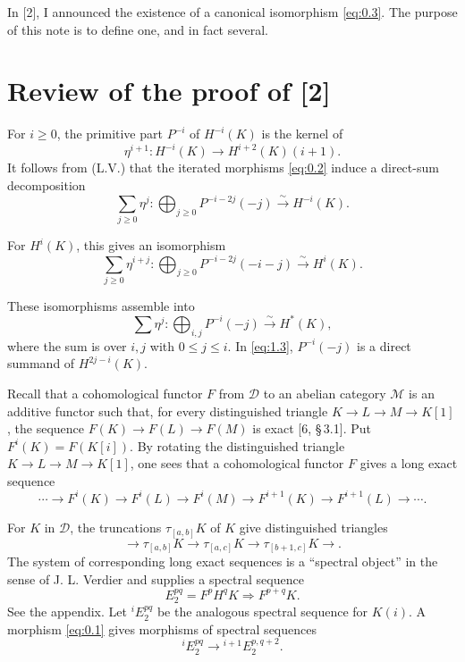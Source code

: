 \documentclass[11pt,a4paper]{article}
\theoremstyle{plain}
\theoremstyle{definition}
\theoremstyle{remark}
\newcommand{\cD}{\mathscr{D}}
\newcommand{\cM}{\mathscr{M}}
\begin{document}
In [2], I announced the existence of a canonical isomorphism \eqref{eq:0.3}. The purpose of this note is to define one, and in fact several.

\section{Review of the proof of [2]}

For $i\geqslant0$, the primitive part $P^{-i}$ of $H^{-i}(K)$ is the kernel of
\[
\eta^{i+1}\colon H^{-i}(K)\to H^{i+2}(K)(i+1).
\]
It follows from (L.V.) that the iterated morphisms \eqref{eq:0.2} induce a direct-sum decomposition
\begin{equation}\label{eq:1.1}
\sum_{j\geqslant0}\eta^j\colon \bigoplus_{j\geqslant0}P^{-i-2j}(-j)\xrightarrow{\sim}H^{-i}(K).
\end{equation}

For $H^i(K)$, this gives an isomorphism
\begin{equation}\label{eq:1.2}
\sum_{j\geqslant0}\eta^{i+j}\colon \bigoplus_{j\geqslant0}P^{-i-2j}(-i-j)\xrightarrow{\sim}H^i(K).
\end{equation}

These isomorphisms assemble into
\begin{equation}\label{eq:1.3}
\sum\eta^j\colon \bigoplus_{i,j}P^{-i}(-j)\xrightarrow{\sim}H^*(K),
\end{equation}
where the sum is over $i,j$ with $0\leqslant j\leqslant i$. In \eqref{eq:1.3}, $P^{-i}(-j)$ is a direct summand of $H^{2j-i}(K)$.

Recall that a cohomological functor $F$ from $\cD$ to an abelian category $\cM$ is an additive functor such that, for every distinguished triangle $K\to L\to M\to K[1]$, the sequence $F(K)\to F(L)\to F(M)$ is exact [6, \S\,3.1]. Put $F^i(K)=F(K[i])$. By rotating the distinguished triangle $K\to L\to M\to K[1]$, one sees that a cohomological functor $F$ gives a long exact sequence
\[
\cdots\to F^i(K)\to F^i(L)\to F^i(M)\to F^{i+1}(K)\to F^{i+1}(L)\to\cdots.
\]

For $K$ in $\cD$, the truncations $\tau_{[a,b]}K$ of $K$ give distinguished triangles
\[
\to \tau_{[a,b]}K\to \tau_{[a,c]}K\to \tau_{[b+1,c]}K\to .
\]
The system of corresponding long exact sequences is a ``spectral object'' in the sense of J. L. Verdier and supplies a spectral sequence
\[
E_2^{pq}=F^pH^qK\Rightarrow F^{p+q}K.
\]
See the appendix. Let ${}^i\!E_2^{pq}$ be the analogous spectral sequence for $K(i)$. A morphism \eqref{eq:0.1} gives morphisms of spectral sequences
\[
{}^i\!E_2^{pq}\to {}^{i+1}\!E_2^{p,q+2}.
\]
\end{document}
